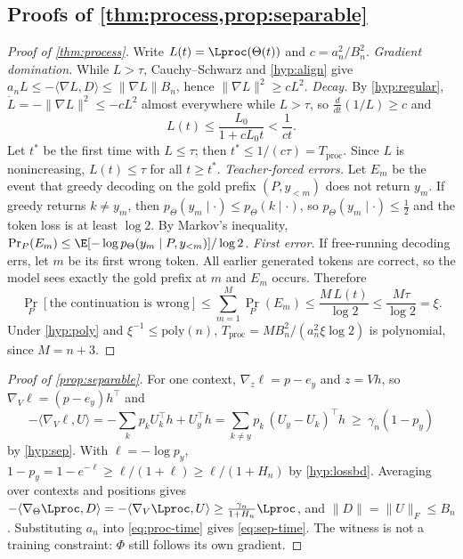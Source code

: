 \subsection{Proofs of \texorpdfstring{\cref{thm:process,prop:separable}}{Theorem 2 and Proposition 3}}\label{app:process}
\begin{proof}[Proof of \cref{thm:process}]
Write $L(t)=\Lproc(\Theta(t))$ and $c=a_n^2/B_n^2$.
\emph{Gradient domination.} While $L>\tau$, Cauchy--Schwarz and \ref{hyp:align} give
$a_nL\le-\langle\nabla L,D\rangle\le\|\nabla L\|B_n$, hence $\|\nabla L\|^2\ge cL^2$.
\emph{Decay.} By \ref{hyp:regular}, $\dot L=-\|\nabla L\|^2\le-cL^2$ almost everywhere while $L>\tau$, so $\frac{d}{dt}(1/L)\ge c$ and
\[
 L(t)\le\frac{L_0}{1+cL_0t}<\frac1{ct}.
\]
Let $t^\ast$ be the first time with $L\le\tau$; then $t^\ast\le1/(c\tau)=T_{\mathrm{proc}}$. Since $L$ is nonincreasing, $L(t)\le\tau$ for all $t\ge t^\ast$.
\emph{Teacher-forced errors.} Let $E_m$ be the event that greedy decoding on the gold prefix $(P,y_{<m})$ does not return $y_m$. If greedy
returns $k\ne y_m$, then $p_\Theta(y_m\mid\cdot)\le p_\Theta(k\mid\cdot)$, so $p_\Theta(y_m\mid\cdot)\le\frac12$ and the token loss is at least $\log2$.
By Markov's inequality, $\Pr_P(E_m)\le\E[-\log p_\Theta(y_m\mid P,y_{<m})]/\log2$.
\emph{First error.} If free-running decoding errs, let $m$ be its first wrong token. All earlier generated tokens are correct, so the model
sees exactly the gold prefix at $m$ and $E_m$ occurs. Therefore
\[
 \Pr_P[\text{the continuation is wrong}]\le\sum_{m=1}^M\Pr_P(E_m)\le\frac{M\,L(t)}{\log2}\le\frac{M\tau}{\log2}=\xi .
\]
Under \ref{hyp:poly} and $\xi^{-1}\le\mathrm{poly}(n)$, $T_{\mathrm{proc}}=MB_n^2/(a_n^2\xi\log2)$ is polynomial, since $M=n+3$.
\end{proof}

\begin{proof}[Proof of \cref{prop:separable}]
For one context, $\nabla_z\ell=p-e_y$ and $z=Vh$, so $\nabla_V\ell=(p-e_y)h^\top$ and
\[
 -\langle\nabla_V\ell,U\rangle=-\sum_kp_kU_k^\top h+U_y^\top h=\sum_{k\ne y}p_k\,(U_y-U_k)^\top h\ \ge\ \gamma_n(1-p_y)
\]
by \ref{hyp:sep}. With $\ell=-\log p_y$, $1-p_y=1-e^{-\ell}\ge\ell/(1+\ell)\ge\ell/(1+H_n)$ by \ref{hyp:lossbd}. Averaging over contexts and positions
gives $-\langle\nabla_\Theta\Lproc,D\rangle=-\langle\nabla_V\Lproc,U\rangle\ge\frac{\gamma_n}{1+H_n}\Lproc$, and $\|D\|=\|U\|_F\le B_n$.
Substituting $a_n$ into \cref{eq:proc-time} gives \cref{eq:sep-time}. The witness is not a training constraint: $\Phi$ still follows its
own gradient.
\end{proof}

